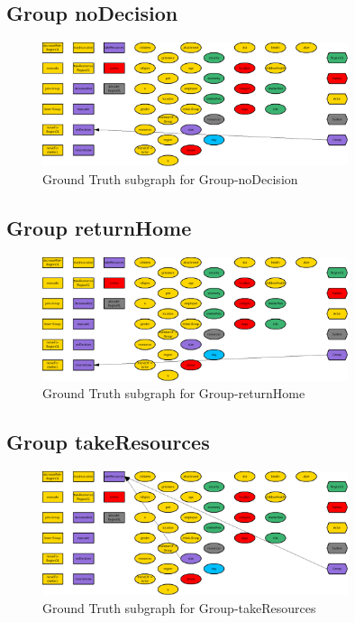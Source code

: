 \documentclass{article}%
\begin{document}
%
\subsection{Group noDecision}%
\label{subsec:Group noDecision}%


\begin{figure}[ht]%
\centering%
\includegraphics[width=0.8\textwidth]{images/Group-noDecision.png}%
\caption{Ground Truth subgraph for Group{-}noDecision}%
\end{figure}

%
\subsection{Group returnHome}%
\label{subsec:Group returnHome}%


\begin{figure}[ht]%
\centering%
\includegraphics[width=0.8\textwidth]{images/Group-returnHome.png}%
\caption{Ground Truth subgraph for Group{-}returnHome}%
\end{figure}

%
\subsection{Group takeResources}%
\label{subsec:Group takeResources}%


\begin{figure}[ht]%
\centering%
\includegraphics[width=0.8\textwidth]{images/Group-takeResources.png}%
\caption{Ground Truth subgraph for Group{-}takeResources}%
\end{figure}
\end{document}
